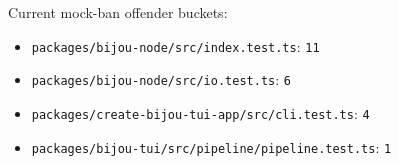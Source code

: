 Current mock-ban offender buckets:

\begin{itemize}
\tightlist
\item
  \texttt{p\allowbreak{}a\allowbreak{}c\allowbreak{}k\allowbreak{}a\allowbreak{}g\allowbreak{}e\allowbreak{}s\allowbreak{}/\allowbreak{}b\allowbreak{}i\allowbreak{}j\allowbreak{}o\allowbreak{}u\allowbreak{}-\allowbreak{}n\allowbreak{}o\allowbreak{}d\allowbreak{}e\allowbreak{}/\allowbreak{}s\allowbreak{}r\allowbreak{}c\allowbreak{}/\allowbreak{}i\allowbreak{}n\allowbreak{}d\allowbreak{}e\allowbreak{}x\allowbreak{}.\allowbreak{}t\allowbreak{}e\allowbreak{}s\allowbreak{}t\allowbreak{}.\allowbreak{}t\allowbreak{}s}: \texttt{1\allowbreak{}1}
\item
  \texttt{p\allowbreak{}a\allowbreak{}c\allowbreak{}k\allowbreak{}a\allowbreak{}g\allowbreak{}e\allowbreak{}s\allowbreak{}/\allowbreak{}b\allowbreak{}i\allowbreak{}j\allowbreak{}o\allowbreak{}u\allowbreak{}-\allowbreak{}n\allowbreak{}o\allowbreak{}d\allowbreak{}e\allowbreak{}/\allowbreak{}s\allowbreak{}r\allowbreak{}c\allowbreak{}/\allowbreak{}i\allowbreak{}o\allowbreak{}.\allowbreak{}t\allowbreak{}e\allowbreak{}s\allowbreak{}t\allowbreak{}.\allowbreak{}t\allowbreak{}s}: \texttt{6}
\item
  \texttt{p\allowbreak{}a\allowbreak{}c\allowbreak{}k\allowbreak{}a\allowbreak{}g\allowbreak{}e\allowbreak{}s\allowbreak{}/\allowbreak{}c\allowbreak{}r\allowbreak{}e\allowbreak{}a\allowbreak{}t\allowbreak{}e\allowbreak{}-\allowbreak{}b\allowbreak{}i\allowbreak{}j\allowbreak{}o\allowbreak{}u\allowbreak{}-\allowbreak{}t\allowbreak{}u\allowbreak{}i\allowbreak{}-\allowbreak{}a\allowbreak{}p\allowbreak{}p\allowbreak{}/\allowbreak{}s\allowbreak{}r\allowbreak{}c\allowbreak{}/\allowbreak{}c\allowbreak{}l\allowbreak{}i\allowbreak{}.\allowbreak{}t\allowbreak{}e\allowbreak{}s\allowbreak{}t\allowbreak{}.\allowbreak{}t\allowbreak{}s}: \texttt{4}
\item
  \texttt{p\allowbreak{}a\allowbreak{}c\allowbreak{}k\allowbreak{}a\allowbreak{}g\allowbreak{}e\allowbreak{}s\allowbreak{}/\allowbreak{}b\allowbreak{}i\allowbreak{}j\allowbreak{}o\allowbreak{}u\allowbreak{}-\allowbreak{}t\allowbreak{}u\allowbreak{}i\allowbreak{}/\allowbreak{}s\allowbreak{}r\allowbreak{}c\allowbreak{}/\allowbreak{}p\allowbreak{}i\allowbreak{}p\allowbreak{}e\allowbreak{}l\allowbreak{}i\allowbreak{}n\allowbreak{}e\allowbreak{}/\allowbreak{}p\allowbreak{}i\allowbreak{}p\allowbreak{}e\allowbreak{}l\allowbreak{}i\allowbreak{}n\allowbreak{}e\allowbreak{}.\allowbreak{}t\allowbreak{}e\allowbreak{}s\allowbreak{}t\allowbreak{}.\allowbreak{}t\allowbreak{}s}: \texttt{1}
\end{itemize}

